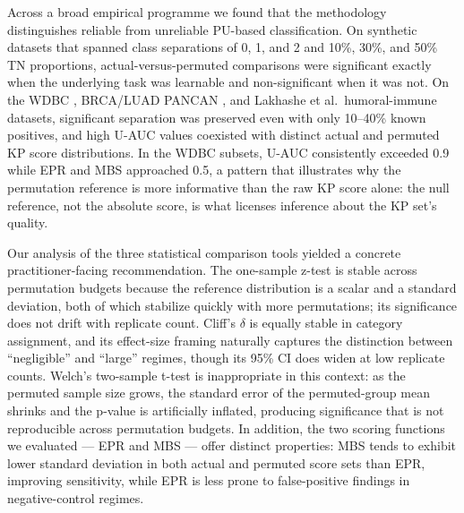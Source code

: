 \documentclass[11pt]{article}
\begin{document}
Across a broad empirical programme we found that the methodology distinguishes reliable from unreliable PU-based classification. On synthetic datasets that spanned class separations of 0, 1, and 2 and 10\%, 30\%, and 50\% TN proportions, actual-versus-permuted comparisons were significant exactly when the underlying task was learnable and non-significant when it was not. On the WDBC \cite{wolberg1999nuclear,wolberg2002computer}, BRCA/LUAD PANCAN \cite{weinstein2013tcga}, and Lakhashe et al.\ humoral-immune \cite{lakhashe2022virosomal,marasini2021enshivig,malherbe2021adenovirus} datasets, significant separation was preserved even with only 10--40\% known positives, and high U-AUC values \cite{hanley1982auc} coexisted with distinct actual and permuted KP score distributions. In the WDBC subsets, U-AUC consistently exceeded 0.9 while EPR and MBS approached 0.5, a pattern that illustrates why the permutation reference is more informative than the raw KP score alone: the null reference, not the absolute score, is what licenses inference about the KP set's quality.

Our analysis of the three statistical comparison tools yielded a concrete practitioner-facing recommendation. The one-sample z-test is stable across permutation budgets because the reference distribution is a scalar and a standard deviation, both of which stabilize quickly with more permutations; its significance does not drift with replicate count. Cliff's $\delta$ \cite{cliff1993dominance} is equally stable in category assignment, and its effect-size framing naturally captures the distinction between ``negligible'' and ``large'' regimes, though its 95\% CI does widen at low replicate counts. Welch's two-sample t-test \cite{ojala2010permutation} is inappropriate in this context: as the permuted sample size grows, the standard error of the permuted-group mean shrinks and the p-value is artificially inflated, producing significance that is not reproducible across permutation budgets. In addition, the two scoring functions we evaluated --- EPR \cite{cheng2015epr} and MBS --- offer distinct properties: MBS tends to exhibit lower standard deviation in both actual and permuted score sets than EPR, improving sensitivity, while EPR is less prone to false-positive findings in negative-control regimes.
\end{document}

